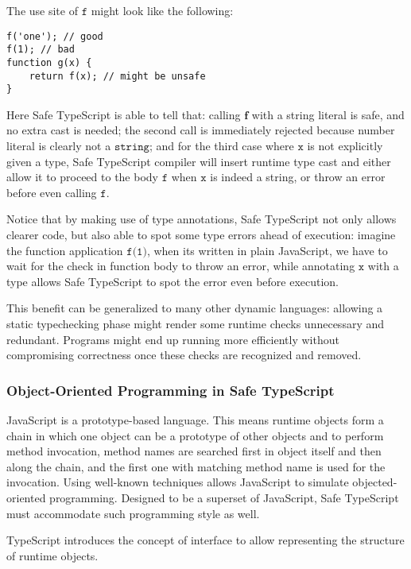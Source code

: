 The use site of $\texttt{f}$ might look like the following:

\begin{verbatim}
f('one'); // good
f(1); // bad
function g(x) {
    return f(x); // might be unsafe
}
\end{verbatim}

Here Safe TypeScript is able to tell that:
calling $\textbf{f}$ with a string literal
is safe, and no extra cast is needed; the second call is immediately rejected
because number literal is clearly not a $\texttt{string}$;
and for the third case where $\texttt{x}$
is not explicitly given a type, Safe TypeScript compiler will insert runtime type cast
and either allow it to proceed to the body $\texttt{f}$ when $\texttt{x}$ is indeed a string,
or throw an error before even calling $\texttt{f}$.

Notice that by making use of type annotations, Safe TypeScript not only allows
clearer code, but also able to spot some type errors ahead of execution:
imagine the function application $\texttt{f(1)}$, when its written in plain JavaScript,
we have to wait for the check in function body to throw an error,
while annotating $\texttt{x}$ with a type allows Safe TypeScript
to spot the error even before execution.

This benefit can be generalized to many other dynamic languages:
allowing a static typechecking phase might render some runtime checks unnecessary
and redundant. Programs might end up running more efficiently
without compromising correctness once these checks are recognized and removed.

\subsubsection{Object-Oriented Programming in Safe TypeScript}


JavaScript is a prototype-based language.
This means runtime objects form a chain in which one object
can be a prototype of other objects and
to perform method invocation, method names are searched
first in object itself and then along the chain,
and the first one with matching method name is used for the invocation.
Using well-known techniques allows JavaScript to simulate objected-oriented programming.
Designed to be a superset of JavaScript, Safe TypeScript must accommodate such programming
style as well.

TypeScript introduces the concept of interface to allow representing the structure
of runtime objects.

